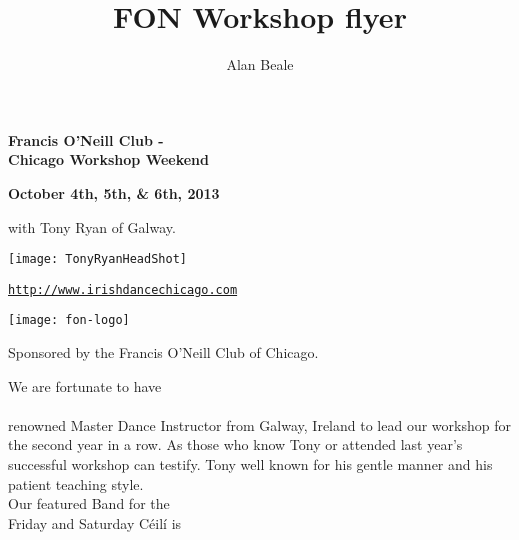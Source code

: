 \documentclass[12pt,
notumble,
letterpaper]{leaflet}
\title{FON Workshop flyer}
\author{Alan Beale}
\date{}
\begin{document}
\begin{center}
{\Large\textbf{Francis O'Neill Club - \\ Chicago Workshop Weekend}}\\ 
\end{center}

\begin{center}
\textbf{October 4th, 5th, \&  6th, 2013} 


\vspace*{0.25em}
with Tony Ryan of Galway.
\end{center}

\vspace*{0.45em}
\begin{center}
\texttt{[image: TonyRyanHeadShot]}
\end{center}

\begin{center}
\vspace*{2em}
{\normalsize \href{http://www.irishdancechicago.com}{\tt http://www.irishdancechicago.com} }

\vspace*{0.45em}
\begin{center}
\texttt{[image: fon-logo]}
\end{center}


{\small Sponsored by the Francis O'Neill Club of Chicago.}
\end{center}


\pagebreak
\begin{center}
We are fortunate to have \\
\\
\vspace*{1em}renowned Master Dance Instructor from Galway, Ireland to
lead our workshop for the second year in a row. As those who know
Tony or attended last year's successful workshop can testify. Tony well
known for his gentle manner and his patient teaching style. \\

\vspace*{4em}
Our featured Band for the \\Friday and Saturday C\'{e}il\'{i} is \\
\end{center}
\pagebreak
\end{document}
